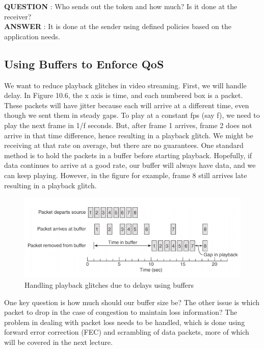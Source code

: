 \documentclass[twoside]{article}
\begin{document}
\textbf{QUESTION} : Who sends out the token and how much? Is it done at the receiver?\\
\textbf{ANSWER} : It is done at the sender using defined policies based on the application needs.

\subsection{Using Buffers to Enforce QoS}
We want to reduce playback glitches in video streaming. First, we will handle delay. In Figure 10.6, the x axis is time, and each numbered box is a packet. These packets will have jitter because each will arrive at a different time, even though we sent them in steady gaps. To play at a constant fps (say f), we need to play the next frame in 1/f seconds. But, after frame 1 arrives, frame 2 does not arrive in that time difference, hence resulting in a playback glitch. We might be receiving at that rate on average, but there are no guarantees. One standard method is to hold the packets in a buffer before starting playback. Hopefully, if data continues to arrive at a good rate, our buffer will always have data, and we can keep playing. However, in the figure for example, frame 8 still arrives late resulting in a playback glitch.
\begin{figure}[t]
\includegraphics[scale=0.5]{Selection_008}
\centering
\caption{Handling playback glitches due to delays using buffers}
\end{figure}

One key question is how much should our buffer size be? The other issue is which packet to drop in the case of congestion to maintain loss information? The problem in dealing with packet loss needs to be handled, which is done using forward error correction (FEC) and scrambling of data packets, more of which will be covered in the next lecture.
\end{document}
